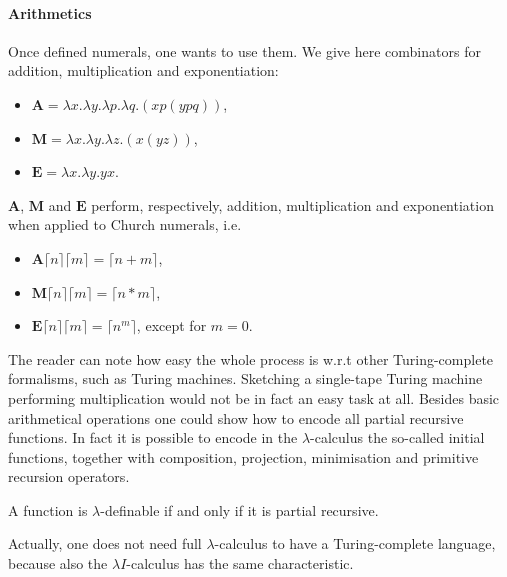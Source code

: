 \paragraph{Arithmetics}
Once defined numerals, one wants to use them. We give here combinators for addition, multiplication and exponentiation:
\begin{itemize}
	\item $\mathbf{A}=\lambda x.\lambda y.\lambda p.\lambda q.(xp(ypq))$,
	\item $\mathbf{M}=\lambda x.\lambda y.\lambda z.(x(yz))$,
	\item $\mathbf{E}=\lambda x.\lambda y.yx$.
\end{itemize}
\begin{proposition}
	$\mathbf{A}$, $\mathbf{M}$ and $\mathbf{E}$ perform, respectively, addition, multiplication and exponentiation when applied to Church numerals, i.e.
	\begin{itemize}
		\item $\mathbf{A}\lceil n\rceil\lceil m\rceil=\lceil n+m\rceil$,
		\item $\mathbf{M}\lceil n\rceil\lceil m\rceil=\lceil n*m\rceil$,
		\item $\mathbf{E}\lceil n\rceil\lceil m\rceil=\lceil n^m\rceil$, except for $m=0$.
	\end{itemize}
\end{proposition}
The reader can note how easy the whole process is w.r.t other Turing-complete formalisms, such as Turing machines. Sketching a single-tape Turing machine performing multiplication would not be in fact an easy task at all. Besides basic arithmetical operations one could show how to encode all partial recursive functions. In fact it is possible  to encode in the $\lambda$-calculus the so-called initial functions, together with composition, projection, minimisation and primitive recursion operators.
\begin{theorem}
	A function is $\lambda$-definable if and only if it is partial recursive.
\end{theorem}
Actually, one does not need full $\lambda$-calculus to have a Turing-complete language, because also the $\lambda I$-calculus has the same characteristic.
